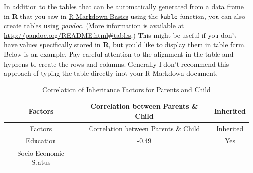 \documentclass [11pt, proquest] {uwthesis}[2015/03/03]
\begin{document}
In addition to the tables that can be automatically generated from a
data frame in \textbf{R} that you saw in
\protect\hyperlink{rmd-basics}{R Markdown Basics} using the
\texttt{kable} function, you can also create tables using \emph{pandoc}.
(More information is available at
\url{http://pandoc.org/README.html\#tables}.) This might be useful if
you don't have values specifically stored in \textbf{R}, but you'd like
to display them in table form. Below is an example. Pay careful
attention to the alignment in the table and hyphens to create the rows
and columns. Generally I don't recommend this approach of typing the
table directly inot your R Markdown document.
\begin{longtable}[]{@{}ccc@{}}
\caption{\label{tab:inher} Correlation of Inheritance Factors for Parents
and Child}\tabularnewline
\toprule
\begin{minipage}[b]{0.29\columnwidth}\centering\strut
Factors\strut
\end{minipage} & \begin{minipage}[b]{0.47\columnwidth}\centering\strut
Correlation between Parents \& Child\strut
\end{minipage} & \begin{minipage}[b]{0.16\columnwidth}\centering\strut
Inherited\strut
\end{minipage}\tabularnewline
\midrule
\endfirsthead
\toprule
\begin{minipage}[b]{0.29\columnwidth}\centering\strut
Factors\strut
\end{minipage} & \begin{minipage}[b]{0.47\columnwidth}\centering\strut
Correlation between Parents \& Child\strut
\end{minipage} & \begin{minipage}[b]{0.16\columnwidth}\centering\strut
Inherited\strut
\end{minipage}\tabularnewline
\midrule
\endhead
\begin{minipage}[t]{0.29\columnwidth}\centering\strut
Education\strut
\end{minipage} & \begin{minipage}[t]{0.47\columnwidth}\centering\strut
-0.49\strut
\end{minipage} & \begin{minipage}[t]{0.16\columnwidth}\centering\strut
Yes\strut
\end{minipage}\tabularnewline
\begin{minipage}[t]{0.29\columnwidth}\centering\strut
Socio-Economic Status\strut

\end{minipage}
\end{longtable}
\end{document}
